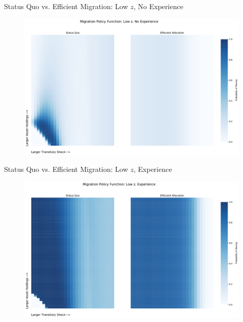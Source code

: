\documentclass[9pt,pdftex,aspectratio=1610]{beamer}
\theoremstyle{definition}
\begin{document}
\begin{frame}[t]{Status Quo vs. Efficient Migration: Low $z$, No Experience}
\begin{figure}[t]
\centerline{\includegraphics[scale = 0.37]{../figures/effecient_migration_policy_low_z_both.pdf}}
\end{figure}
\end{frame}

\begin{frame}[t]{Status Quo vs. Efficient Migration: Low $z$, Experience}
\begin{figure}[t]
\centerline{\includegraphics[scale = 0.37]{../figures/effecient_migration_policy_exp_z_both.pdf}}
\end{figure}
\end{frame}

\end{document}
